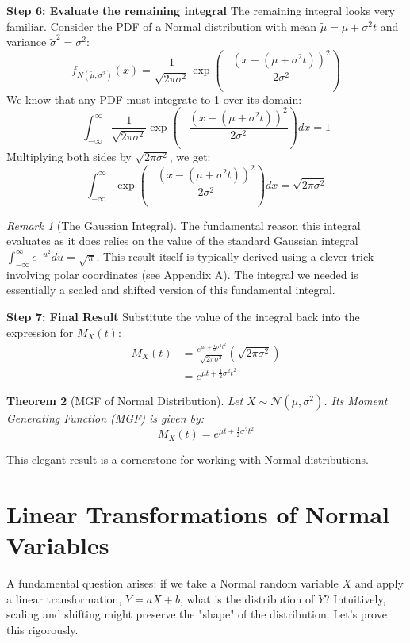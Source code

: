 \documentclass[11pt, letterpaper]{article}
\newtheorem{theorem}{Theorem}[section]
\theoremstyle{definition}
\theoremstyle{remark}
\newtheorem{remark}[theorem]{Remark}
\begin{document}
\textbf{Step 6: Evaluate the remaining integral}
The remaining integral looks very familiar. Consider the PDF of a Normal distribution with mean $\tilde{\mu} = \mu + \sigma^2 t$ and variance $\tilde{\sigma}^2 = \sigma^2$:
$$ f_{N(\tilde{\mu}, \sigma^2)}(x) = \frac{1}{\sqrt{2 \pi \sigma^2}} \exp\left( -\frac{(x - (\mu + \sigma^2 t))^2}{2\sigma^2} \right) $$
We know that any PDF must integrate to 1 over its domain:
$$ \int_{-\infty}^{\infty} \frac{1}{\sqrt{2 \pi \sigma^2}} \exp\left( -\frac{(x - (\mu + \sigma^2 t))^2}{2\sigma^2} \right) dx = 1 $$
Multiplying both sides by $\sqrt{2 \pi \sigma^2}$, we get:
$$ \int_{-\infty}^{\infty} \exp\left( -\frac{(x - (\mu + \sigma^2 t))^2}{2\sigma^2} \right) dx = \sqrt{2 \pi \sigma^2} $$

\begin{remark}[The Gaussian Integral]
The fundamental reason this integral evaluates as it does relies on the value of the standard Gaussian integral $\int_{-\infty}^{\infty} e^{-u^2} du = \sqrt{\pi}$. This result itself is typically derived using a clever trick involving polar coordinates (see Appendix A). The integral we needed is essentially a scaled and shifted version of this fundamental integral.
\end{remark}

\textbf{Step 7: Final Result}
Substitute the value of the integral back into the expression for $M_X(t)$:
\begin{align*}
    M_X(t) &= \frac{e^{\mu t + \frac{1}{2}\sigma^2 t^2}}{\sqrt{2 \pi \sigma^2}} \left( \sqrt{2 \pi \sigma^2} \right) \\
           &= e^{\mu t + \frac{1}{2}\sigma^2 t^2} 
\end{align*}

\begin{theorem}[MGF of Normal Distribution]
Let $X \sim \mathcal{N}(\mu, \sigma^2)$. Its Moment Generating Function (MGF) is given by:
\begin{equation}
    M_X(t) = e^{\mu t + \frac{1}{2}\sigma^2 t^2}
    \label{eq:mgf_normal}
\end{equation}
\end{theorem}
This elegant result is a cornerstone for working with Normal distributions.

\section{Linear Transformations of Normal Variables}

A fundamental question arises: if we take a Normal random variable $X$ and apply a linear transformation, $Y = aX+b$, what is the distribution of $Y$? Intuitively, scaling and shifting might preserve the "shape" of the distribution. Let's prove this rigorously.
\end{document}
